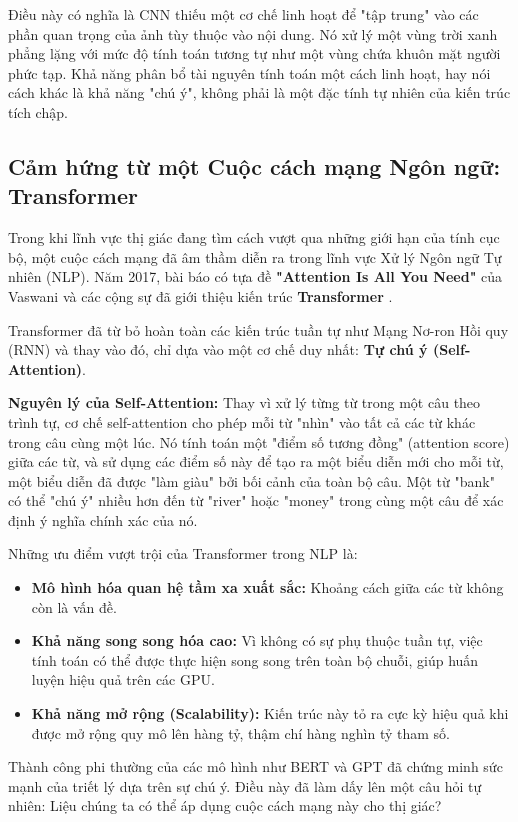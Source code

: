Điều này có nghĩa là CNN thiếu một cơ chế linh hoạt để "tập trung" vào các phần quan trọng của ảnh tùy thuộc vào nội dung. Nó xử lý một vùng trời xanh phẳng lặng với mức độ tính toán tương tự như một vùng chứa khuôn mặt người phức tạp. Khả năng phân bổ tài nguyên tính toán một cách linh hoạt, hay nói cách khác là khả năng "chú ý", không phải là một đặc tính tự nhiên của kiến trúc tích chập.

\subsection{Cảm hứng từ một Cuộc cách mạng Ngôn ngữ: Transformer}
\label{subsec:inspiration_from_nlp}
Trong khi lĩnh vực thị giác đang tìm cách vượt qua những giới hạn của tính cục bộ, một cuộc cách mạng đã âm thầm diễn ra trong lĩnh vực Xử lý Ngôn ngữ Tự nhiên (NLP). Năm 2017, bài báo có tựa đề \textbf{"Attention Is All You Need"} của Vaswani và các cộng sự đã giới thiệu kiến trúc \textbf{Transformer} \cite{Vaswani2017}.

Transformer đã từ bỏ hoàn toàn các kiến trúc tuần tự như Mạng Nơ-ron Hồi quy (RNN) và thay vào đó, chỉ dựa vào một cơ chế duy nhất: \textbf{Tự chú ý (Self-Attention)}.

\textbf{Nguyên lý của Self-Attention:} Thay vì xử lý từng từ trong một câu theo trình tự, cơ chế self-attention cho phép mỗi từ "nhìn" vào tất cả các từ khác trong câu cùng một lúc. Nó tính toán một "điểm số tương đồng" (attention score) giữa các từ, và sử dụng các điểm số này để tạo ra một biểu diễn mới cho mỗi từ, một biểu diễn đã được "làm giàu" bởi bối cảnh của toàn bộ câu. Một từ "bank" có thể "chú ý" nhiều hơn đến từ "river" hoặc "money" trong cùng một câu để xác định ý nghĩa chính xác của nó.

Những ưu điểm vượt trội của Transformer trong NLP là:
\begin{itemize}
	\item \textbf{Mô hình hóa quan hệ tầm xa xuất sắc:} Khoảng cách giữa các từ không còn là vấn đề.
	\item \textbf{Khả năng song song hóa cao:} Vì không có sự phụ thuộc tuần tự, việc tính toán có thể được thực hiện song song trên toàn bộ chuỗi, giúp huấn luyện hiệu quả trên các GPU.
	\item \textbf{Khả năng mở rộng (Scalability):} Kiến trúc này tỏ ra cực kỳ hiệu quả khi được mở rộng quy mô lên hàng tỷ, thậm chí hàng nghìn tỷ tham số.
\end{itemize}
Thành công phi thường của các mô hình như BERT và GPT đã chứng minh sức mạnh của triết lý dựa trên sự chú ý. Điều này đã làm dấy lên một câu hỏi tự nhiên: Liệu chúng ta có thể áp dụng cuộc cách mạng này cho thị giác?

